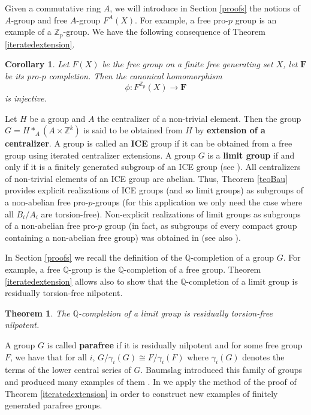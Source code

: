 \documentclass[11pt]{amsart}
\newtheorem{teo}[lem]{Theorem}
\newtheorem{cor}[lem]{Corollary}
\numberwithin{claimcounter}{lem}
\newcommand{\Z}{\mathbb{Z}}
\newcommand{\Q}{\mathbb{Q}}
\begin{document}
 
Given a commutative ring $A$, we will introduce in Section \ref{proofs}  the notions of $A$-group and free $A$-group $F^A(X)$. For example, a free pro-$p$ group is an example of a $\Z_p$-group. 
We have the following  consequence of Theorem \ref{iteratedextension}.
\begin{cor}\label{Zpgroup}
 Let $F(X)$ be the free group on a finite free generating set $X$, let $\mathbf F$ be its pro-$p$ completion. Then the canonical homomorphism
$$\phi:F^{\Z_p}(X)\to \mathbf F$$ is injective.
\end{cor}

Let $H$ be a group and
$A$ the centralizer of a non-trivial  element. Then the group $G = H*_A(A\times \Z^k)$ is said to be obtained from $H$  by {\bf extension of a centralizer}. 
A group is called an {\bf ICE}  group if it can be obtained from a free group using   iterated centralizer extensions. A group $G$ is a {\bf limit group} if and only if it is a finitely generated subgroup of an ICE group  (see \cite{KM06, CG05}). All centralizers of non-trivial elements of an ICE group are abelian.
Thus, Theorem \ref{teoBau} provides explicit realizations   of ICE groups (and so limit groups) as subgroups of a non-abelian free pro-$p$-groups (for this application we only need the case where all $B_i/A_i$ are torsion-free). Non-explicit realizations of limit groups as subgroups of a non-abelian free pro-$p$ group (in fact, as subgroups of every compact group containing a non-abelian free group) was obtained in \cite{BG10} (see also \cite{BGSS06}).

In Section \ref{proofs} we recall the definition of the $\Q$-completion of a group $G$. For example, a free $\Q$-group is the $\Q$-completion of a free group. Theorem \ref{iteratedextension} allows also to show that the $\Q$-completion of a limit group is residually torsion-free nilpotent.
\begin{teo}\label{Qlimit}
The $\Q$-completion of a limit group is residually torsion-free nilpotent.
\end{teo}
A group $G$ is called {\bf parafree}  if   it is residually nilpotent and for some free group $F$, we have that for all $i$, $G/\gamma_i(G)\cong F/\gamma_i(F)$ where $\gamma_i(G)$ denotes the terms of the lower central series of $G$.  Baumslag introduced this family of groups and  produced many examples of them \cite{Ba67}.
In \cite{JM21} we apply the method of the proof of  Theorem \ref{iteratedextension} in order to construct new examples of finitely generated parafree groups.
\end{document}
